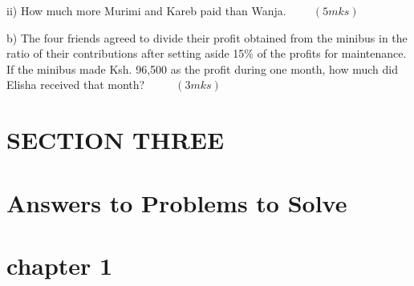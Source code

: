 \documentclass[
  a4paperpaper,
]{scrbook}
\begin{document}
\begin{tcolorbox}
\begin{enumerate}
  ii) How much more Murimi and Kareb paid than
  Wanja.\(\hspace{1cm} (5mks)\)

  b) The four friends agreed to divide their profit obtained from the
  minibus in the ratio of their contributions after setting aside 15\%
  of the profits for maintenance. If the minibus made Ksh. 96,500 as the
  profit during one month, how much did Elisha received that month?
  \(\hspace{1cm}(3mks)\)
\end{enumerate}

\end{tcolorbox}


\hypertarget{section-three}{%
\chapter*{SECTION THREE}\label{section-three}}



\hypertarget{answers-to-problems-to-solve}{%
\chapter*{Answers to Problems to
Solve}\label{answers-to-problems-to-solve}}



\hypertarget{chapter-1}{%
\chapter*{chapter 1}\label{chapter-1}}

\end{document}
